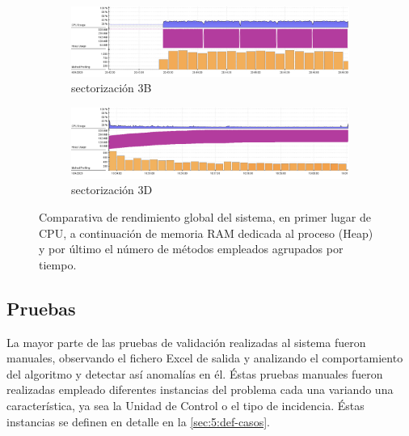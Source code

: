 \begin{figure}
	\centering
	\begin{subfigure}{\linewidth}
		\centering
		\includegraphics[width=1\linewidth]{capitulos/Capitulo4-Implementacion/recursos/Performance-legacy}
		\caption{sectorización 3B\linebreak}
		\label{fig:4:performance-legacy}
	\end{subfigure}
	
	\begin{subfigure}{\linewidth}
		\centering
		\includegraphics[width=1\linewidth]{capitulos/Capitulo4-Implementacion/recursos/Performance-system}
		\caption{sectorización 3D\linebreak}
		\label{fig:4:performance-system}
	\end{subfigure}
	
	\caption[Comparativa de rendimiento global del sistema]{Comparativa de rendimiento global del sistema, en primer lugar de CPU, a continuación de memoria RAM dedicada al proceso (Heap) y por último el número de métodos empleados agrupados por tiempo.}
	\label{fig:4:performance-comparativa}
\end{figure}



\subsection{Pruebas}
\label{sec:4:tests}

La mayor parte de las pruebas de validación realizadas al sistema fueron manuales, observando el fichero Excel de salida y analizando el comportamiento del algoritmo y detectar así anomalías en él. Éstas pruebas manuales fueron realizadas empleado diferentes instancias del problema cada una variando una característica, ya sea la Unidad de Control o el tipo de incidencia. Éstas instancias se definen en detalle en la \autoref{sec:5:def-casos}.

